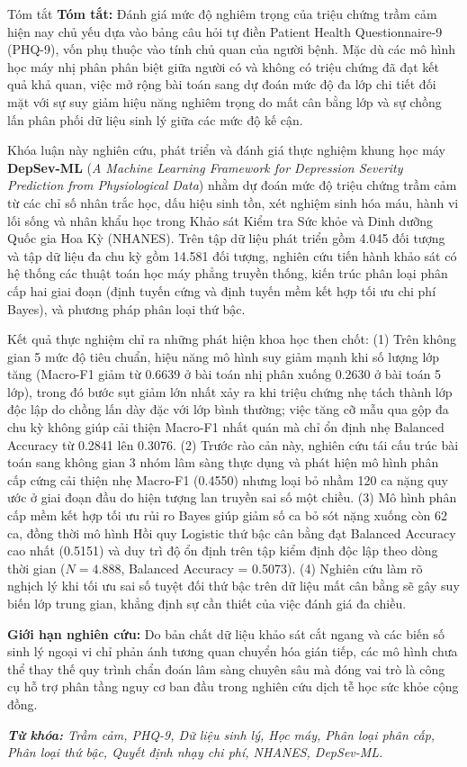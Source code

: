 \documentclass{uetgraduation}
\begin{document}
\begin{preamble}{Tóm tắt}
\textbf{Tóm tắt:} Đánh giá mức độ nghiêm trọng của triệu chứng trầm cảm hiện nay chủ yếu dựa vào bảng câu hỏi tự điền Patient Health Questionnaire-9 (PHQ-9), vốn phụ thuộc vào tính chủ quan của người bệnh. Mặc dù các mô hình học máy nhị phân phân biệt giữa người có và không có triệu chứng đã đạt kết quả khả quan, việc mở rộng bài toán sang dự đoán mức độ đa lớp chi tiết đối mặt với sự suy giảm hiệu năng nghiêm trọng do mất cân bằng lớp và sự chồng lấn phân phối dữ liệu sinh lý giữa các mức độ kế cận.

Khóa luận này nghiên cứu, phát triển và đánh giá thực nghiệm khung học máy \textbf{DepSev-ML} (\textit{A Machine Learning Framework for Depression Severity Prediction from Physiological Data}) nhằm dự đoán mức độ triệu chứng trầm cảm từ các chỉ số nhân trắc học, dấu hiệu sinh tồn, xét nghiệm sinh hóa máu, hành vi lối sống và nhân khẩu học trong Khảo sát Kiểm tra Sức khỏe và Dinh dưỡng Quốc gia Hoa Kỳ (NHANES). Trên tập dữ liệu phát triển gồm 4.045 đối tượng và tập dữ liệu đa chu kỳ gồm 14.581 đối tượng, nghiên cứu tiến hành khảo sát có hệ thống các thuật toán học máy phẳng truyền thống, kiến trúc phân loại phân cấp hai giai đoạn (định tuyến cứng và định tuyến mềm kết hợp tối ưu chi phí Bayes), và phương pháp phân loại thứ bậc.

Kết quả thực nghiệm chỉ ra những phát hiện khoa học then chốt: (1) Trên không gian 5 mức độ tiêu chuẩn, hiệu năng mô hình suy giảm mạnh khi số lượng lớp tăng (Macro-F1 giảm từ 0.6639 ở bài toán nhị phân xuống 0.2630 ở bài toán 5 lớp), trong đó bước sụt giảm lớn nhất xảy ra khi triệu chứng nhẹ tách thành lớp độc lập do chồng lấn dày đặc với lớp bình thường; việc tăng cỡ mẫu qua gộp đa chu kỳ không giúp cải thiện Macro-F1 nhất quán mà chỉ ổn định nhẹ Balanced Accuracy từ 0.2841 lên 0.3076. (2) Trước rào cản này, nghiên cứu tái cấu trúc bài toán sang không gian 3 nhóm lâm sàng thực dụng và phát hiện mô hình phân cấp cứng cải thiện nhẹ Macro-F1 (0.4550) nhưng loại bỏ nhầm 120 ca nặng quy ước ở giai đoạn đầu do hiện tượng lan truyền sai số một chiều. (3) Mô hình phân cấp mềm kết hợp tối ưu rủi ro Bayes giúp giảm số ca bỏ sót nặng xuống còn 62 ca, đồng thời mô hình Hồi quy Logistic thứ bậc cân bằng đạt Balanced Accuracy cao nhất (0.5151) và duy trì độ ổn định trên tập kiểm định độc lập theo dòng thời gian ($N = 4.888$, Balanced Accuracy = 0.5073). (4) Nghiên cứu làm rõ nghịch lý khi tối ưu sai số tuyệt đối thứ bậc trên dữ liệu mất cân bằng sẽ gây suy biến lớp trung gian, khẳng định sự cần thiết của việc đánh giá đa chiều.

\textbf{Giới hạn nghiên cứu:} Do bản chất dữ liệu khảo sát cắt ngang và các biến số sinh lý ngoại vi chỉ phản ánh tương quan chuyển hóa gián tiếp, các mô hình chưa thể thay thế quy trình chẩn đoán lâm sàng chuyên sâu mà đóng vai trò là công cụ hỗ trợ phân tầng nguy cơ ban đầu trong nghiên cứu dịch tễ học sức khỏe cộng đồng.

\vspace{0.6cm}
\noindent \textit{\textbf{Từ khóa:} Trầm cảm, PHQ-9, Dữ liệu sinh lý, Học máy, Phân loại phân cấp, Phân loại thứ bậc, Quyết định nhạy chi phí, NHANES, DepSev-ML.}
\end{preamble}
\end{document}

